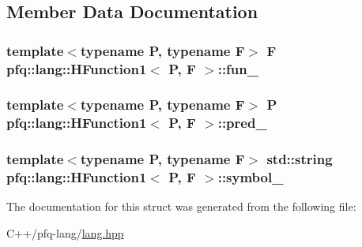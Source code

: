 \subsection{Member Data Documentation}
\hypertarget{structpfq_1_1lang_1_1HFunction1_ac06d15b850523c9d36421fa76d862b9e}{
\subsubsection[{fun\+\_\+}]{\setlength{\rightskip}{0pt plus 5cm}template$<$typename P, typename F$>$ F {\bf pfq\+::lang\+::\+H\+Function1}$<$ P, F $>$\+::fun\+\_\+}}\label{structpfq_1_1lang_1_1HFunction1_ac06d15b850523c9d36421fa76d862b9e}
\hypertarget{structpfq_1_1lang_1_1HFunction1_ac0747a1da657d3b4a43bef6d8b67307c}{
\subsubsection[{pred\+\_\+}]{\setlength{\rightskip}{0pt plus 5cm}template$<$typename P, typename F$>$ P {\bf pfq\+::lang\+::\+H\+Function1}$<$ P, F $>$\+::pred\+\_\+}}\label{structpfq_1_1lang_1_1HFunction1_ac0747a1da657d3b4a43bef6d8b67307c}
\hypertarget{structpfq_1_1lang_1_1HFunction1_a4e934ec3ab5d867ade09b56bfd81b2ab}{
\subsubsection[{symbol\+\_\+}]{\setlength{\rightskip}{0pt plus 5cm}template$<$typename P, typename F$>$ std\+::string {\bf pfq\+::lang\+::\+H\+Function1}$<$ P, F $>$\+::symbol\+\_\+}}\label{structpfq_1_1lang_1_1HFunction1_a4e934ec3ab5d867ade09b56bfd81b2ab}


The documentation for this struct was generated from the following file\+:\begin{DoxyCompactItemize}
\item 
C++/pfq-\/lang/\hyperlink{lang_8hpp}{lang.\+hpp}\end{DoxyCompactItemize}
